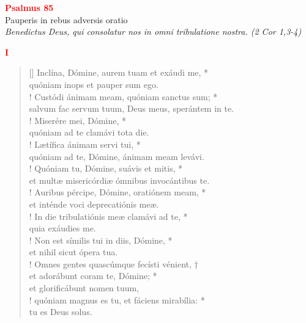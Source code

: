 


\def\greinitialformat#1{%
{\fontsize{39}{39}\selectfont #1}%
}




\vspace{0.3cm}
\begin{center}
 \textcolor{red}{\large \bf Psalmus 85}\\
Pauperis in rebus adversis oratio\\
\textit{\small Benedictus Deus, qui consolatur nos in omni tribulatione nostra. (2 Cor 1,3-4)}
\end{center}
\begin{center}
\textcolor{red}{\bf I}
\end{center}
\begin{verse}[\versewidth]
Inclína, Dómine, aurem tuam et exáudi me, *\\
quóniam inops et pauper sum ego.\\!
\vin Custódi ánimam meam, quóniam sanctus sum; *\\
\vin salvum fac servum tuum, Deus meus, sperántem in te.\\!
Miserére mei, Dómine, *\\
quóniam ad te clamávi tota die.\\!
\vin Lætífica ánimam servi tui, *\\
\vin quóniam ad te, Dómine, ánimam meam levávi.\\!
Quóniam tu, Dómine, suávis et mitis, *\\
et multæ misericórdiæ ómnibus invocántibus te.\\!
\vin Auribus pércipe, Dómine, oratiónem meam, *\\
\vin et inténde voci deprecatiónis meæ.\\!
In die tribulatiónis meæ clamávi ad te, *\\
quia exáudies me.\\!
\vin Non est símilis tui in diis, Dómine, *\\
\vin et nihil sicut ópera tua.\\!
Omnes gentes quascúmque fecísti vénient, †\\
et adorábunt coram te, Dómine; *\\
et glorificábunt nomen tuum,\\!
\vin quóniam magnus es tu, et fáciens mirabília: *\\
\vin tu es Deus solus.\\
\end{verse}
